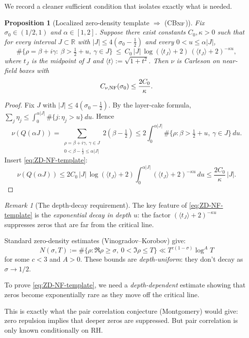 \documentclass[11pt]{article}
\newtheorem{proposition}[theorem]{Proposition}
\theoremstyle{definition}
\theoremstyle{remark}
\newtheorem{remark}[theorem]{Remark}
\theoremstyle{definition}
\begin{document}
We record a cleaner sufficient condition that isolates exactly what is needed.

\begin{proposition}[Localized zero-density template $\Rightarrow$ \textup{(CB$_{\rm NF}$)}]\label{prop:ZD-to-nuCarlesonNF}
Fix $\sigma_0 \in (1/2, 1)$ and $\alpha \in [1,2]$. Suppose there exist constants $C_0, \kappa > 0$ such that for every interval $J \subset \mathbb{R}$ with $|J| \le 4(\sigma_0 - \tfrac{1}{2})$ and every $0 < u \le \alpha|J|$,
\begin{equation}\label{eq:ZD-NF-template}
  \#\big\{\rho = \beta + i\gamma :\ \beta > \tfrac{1}{2} + u,\ \gamma \in J\big\}
  \ \le\ C_0\,|J|\,\log(\langle t_J \rangle + 2)\,(\langle t_J \rangle + 2)^{-\kappa u},
\end{equation}
where $t_J$ is the midpoint of $J$ and $\langle t \rangle := \sqrt{1 + t^2}$.
Then $\nu$ is Carleson on near-field boxes with
\[
  C_{\nu,{\rm NF}}(\sigma_0) \le \frac{2C_0}{\kappa}.
\]
\end{proposition}
\begin{proof}
Fix $J$ with $|J| \le 4(\sigma_0 - \tfrac{1}{2})$.
By the layer-cake formula, $\sum_j \eta_j \le \int_0^{\alpha|J|} \#\{j : \eta_j > u\}\,du$.
Hence
\[
  \nu(Q(\alpha J)) = \sum_{\substack{\rho = \beta + i\gamma,\ \gamma \in J \\ 0 < \beta - \tfrac{1}{2} \le \alpha|J|}} 2(\beta - \tfrac{1}{2})
  \le 2\int_0^{\alpha|J|} \#\{\rho : \beta > \tfrac{1}{2} + u,\ \gamma \in J\}\,du.
\]
Insert \eqref{eq:ZD-NF-template}:
\[
  \nu(Q(\alpha J)) \le 2C_0\,|J|\,\log(\langle t_J \rangle + 2) \int_0^{\alpha|J|} (\langle t_J \rangle + 2)^{-\kappa u}\,du
  \le \frac{2C_0}{\kappa}\,|J|.
\]
\end{proof}

\begin{remark}[The depth-decay requirement]\label{rem:depth-decay}
The key feature of \eqref{eq:ZD-NF-template} is the \emph{exponential decay in depth $u$}: the factor $(\langle t_J \rangle + 2)^{-\kappa u}$ suppresses zeros that are far from the critical line.

Standard zero-density estimates (Vinogradov--Korobov) give:
\[
  N(\sigma, T) := \#\{\rho : \Re\rho \ge \sigma,\ 0 < \Im\rho \le T\} \ll T^{c(1-\sigma)}\log^A T
\]
for some $c < 3$ and $A > 0$. These bounds are \emph{depth-uniform}: they don't decay as $\sigma \to 1/2$.

To prove \eqref{eq:ZD-NF-template}, we need a \emph{depth-dependent} estimate showing that zeros become exponentially rare as they move off the critical line.

This is exactly what the pair correlation conjecture (Montgomery) would give: zero repulsion implies that deeper zeros are suppressed. But pair correlation is only known conditionally on RH.
\end{remark}
\end{document}
